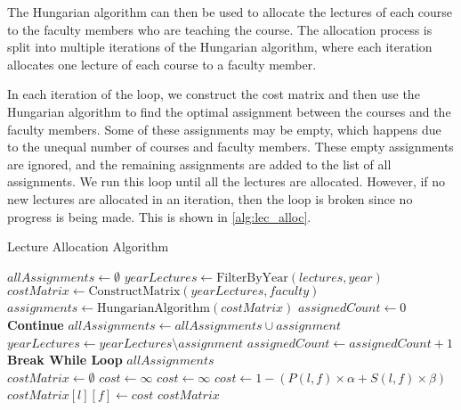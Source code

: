 The Hungarian algorithm can then be used to allocate the lectures of each course to the faculty members who are teaching the course. The allocation process is split into multiple iterations of the Hungarian algorithm, where each iteration allocates one lecture of each course to a faculty member.

In each iteration of the loop, we construct the cost matrix and then use the Hungarian algorithm to find the optimal assignment between the courses and the faculty members. Some of these assignments may be empty, which happens due to the unequal number of courses and faculty members. These empty assignments are ignored, and the remaining assignments are added to the list of all assignments. We run this loop until all the lectures are allocated. However, if no new lectures are allocated in an iteration, then the loop is broken since no progress is being made. This is shown in \autoref{alg:lec_alloc}.

\begin{algorithm}[H]
  \caption{Lecture Allocation Algorithm}
  \begin{algorithmic}[1]
    \State $allAssignments \gets \emptyset$
     
    \State $yearLectures \gets \text{FilterByYear}(lectures, year)$
     
    \State $costMatrix \gets \text{ConstructMatrix}(yearLectures, faculty)$
    \State $assignments \gets \text{HungarianAlgorithm}(costMatrix)$
    \State $assignedCount \gets 0$
    \State \textbf{Continue}
    \EndIf
    \State $allAssignments \gets allAssignments \cup assignment$
    \State $yearLectures \gets yearLectures \setminus assignment$
    \State $assignedCount \gets assignedCount + 1$
    \EndFor
    \State \textbf{Break While Loop}
    \EndIf
    \EndWhile
    \EndFor
    \State \Return $allAssignments$
    \EndProcedure
    \\
    \State $costMatrix \gets \emptyset$
    \State $cost \gets \infty$
    \State $cost \gets \infty$
    \Else
    \State $cost \gets 1 - (P(l, f) \times \alpha + S(l, f) \times \beta)$
    \EndIf
    \State $costMatrix[l][f] \gets cost$
    \EndFor
    \EndFor
    \Return $costMatrix$
    \EndProcedure
  \end{algorithmic}
  \label{alg:lec_alloc}
\end{algorithm}

